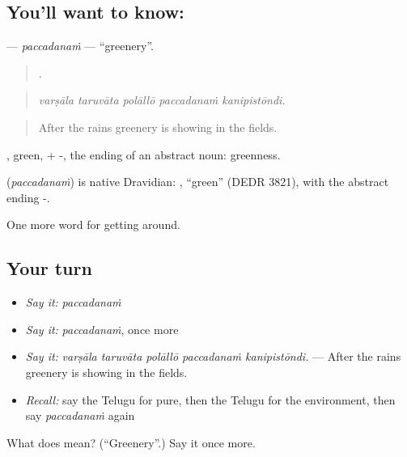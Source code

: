 \subsection*{You'll want to know: }
\textbf{} — \emph{paccadanaṁ} — \textquotedblleft{}greenery\textquotedblright{}.

\begin{quote}
    .
\end{quote}

\begin{quote}
\emph{varṣāla taruvāta polāllō paccadanaṁ kanipistōndi.}
\end{quote}

\begin{quote}
After the rains greenery is showing in the fields.
\end{quote}

, green, + -, the ending of an abstract noun: greenness.

\begin{cousinweb}
\textbf{} (\emph{paccadanaṁ}) is native Dravidian: , \textquotedblleft{}green\textquotedblright{} (DEDR 3821), with the abstract ending -.
\end{cousinweb}

\begin{grammarlens}[title={What you've built}]
One more word for getting around.
\end{grammarlens}

\subsection*{Your turn}
\begin{itemize}
\raggedright
  \item \emph{Say it:} \emph{paccadanaṁ}
  \item \emph{Say it:} \emph{paccadanaṁ}, once more
  \item \emph{Say it:} \emph{varṣāla taruvāta polāllō paccadanaṁ kanipistōndi.} — After the rains greenery is showing in the fields.
  \item \emph{Recall:} say the Telugu for pure, then the Telugu for the environment, then say \emph{paccadanaṁ} again
\end{itemize}

\begin{tcolorbox}[breakable,colback=teal!4,colframe=teal!35!black,title={Before you move on}]
What does  mean? (\textquotedblleft{}Greenery\textquotedblright{}.) Say it once more.
\end{tcolorbox}

